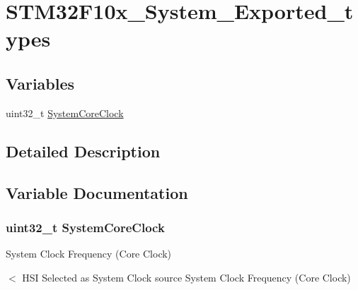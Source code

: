 \hypertarget{group___s_t_m32_f10x___system___exported__types}{\section{S\-T\-M32\-F10x\-\_\-\-System\-\_\-\-Exported\-\_\-types}
\label{group___s_t_m32_f10x___system___exported__types}
}
\subsection*{Variables}
\begin{DoxyCompactItemize}
\item 
uint32\-\_\-t \hyperlink{group___s_t_m32_f10x___system___exported__types_gaa3cd3e43291e81e795d642b79b6088e6}{System\-Core\-Clock}
\end{DoxyCompactItemize}


\subsection{Detailed Description}


\subsection{Variable Documentation}
\hypertarget{group___s_t_m32_f10x___system___exported__types_gaa3cd3e43291e81e795d642b79b6088e6}{
\subsubsection[{System\-Core\-Clock}]{\setlength{\rightskip}{0pt plus 5cm}uint32\-\_\-t System\-Core\-Clock}}\label{group___s_t_m32_f10x___system___exported__types_gaa3cd3e43291e81e795d642b79b6088e6}
System Clock Frequency (Core Clock)

$<$ H\-S\-I Selected as System Clock source System Clock Frequency (Core Clock) 